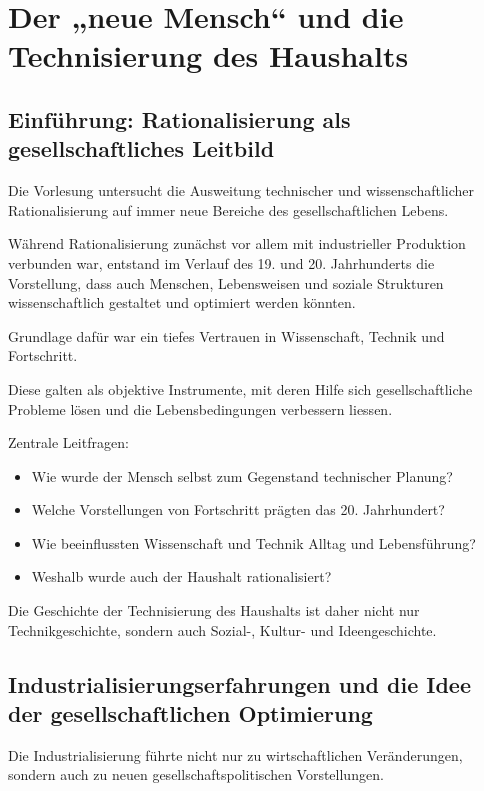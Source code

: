 \section{Der „neue Mensch“ und die Technisierung des Haushalts}

\subsection{Einführung: Rationalisierung als gesellschaftliches Leitbild}

Die Vorlesung untersucht die Ausweitung technischer und wissenschaftlicher
Rationalisierung auf immer neue Bereiche des gesellschaftlichen Lebens.

Während Rationalisierung zunächst vor allem mit industrieller Produktion
verbunden war, entstand im Verlauf des 19. und 20. Jahrhunderts die Vorstellung,
dass auch Menschen, Lebensweisen und soziale Strukturen
wissenschaftlich gestaltet und optimiert werden könnten.

Grundlage dafür war ein tiefes Vertrauen in Wissenschaft,
Technik und Fortschritt.

Diese galten als objektive Instrumente,
mit deren Hilfe sich gesellschaftliche Probleme lösen
und die Lebensbedingungen verbessern liessen.

Zentrale Leitfragen:

\begin{itemize}
    \item Wie wurde der Mensch selbst zum Gegenstand technischer Planung?
    \item Welche Vorstellungen von Fortschritt prägten das 20. Jahrhundert?
    \item Wie beeinflussten Wissenschaft und Technik Alltag und Lebensführung?
    \item Weshalb wurde auch der Haushalt rationalisiert?
\end{itemize}

Die Geschichte der Technisierung des Haushalts ist daher nicht nur
Technikgeschichte, sondern auch Sozial-, Kultur- und Ideengeschichte.

\subsection{Industrialisierungserfahrungen und die Idee der gesellschaftlichen Optimierung}

Die Industrialisierung führte nicht nur zu wirtschaftlichen Veränderungen,
sondern auch zu neuen gesellschaftspolitischen Vorstellungen.

